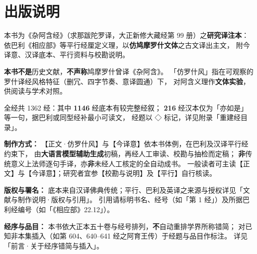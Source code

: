
\chapter*{出版说明}

本书为《杂阿含经》（求那跋陀罗译，大正新修大藏经第 99 册）之\textbf{研究译注本}：
依巴利《相应部》等平行经厘定义理，以\textbf{仿鸠摩罗什文体}之古文译出主文，
附今译意、汉译底本、平行资料与校勘说明。

\vspace{0.8em}
\noindent\textbf{本书不是}历史文献，\textbf{不声称}鸠摩罗什曾译《杂阿含》。
「仿罗什风」指在可观察的罗什译经风格特征（删冗、四字节奏、意译圆通）下，
对阿含义理作\textbf{文体实验}，供阅读与学术对照。

\vspace{0.8em}
\noindent 全经共 1362 经：其中 \textbf{1146} 经底本有较完整经叙；
\textbf{216} 经汉本仅为「亦如是」等一句，据巴利或同型经补最小可读文，
经题以 ◇ 标记，详见附录「重建经目录」。

\vspace{0.8em}
\noindent\textbf{制作方式：}
【正文·仿罗什风】与【今译意】依本书体例，在巴利及汉译平行经约束下，
由\textbf{大语言模型辅助生成}初稿，再经人工审读、校勘与抽检而定稿；
\textbf{非}传统意义上法师逐句手译，亦\textbf{非}未经人工核定的全自动成书。
一般读者可主读【正文】与【今译意】；研究者宜参【校勘与说明】及【平行】自行核读。

\vspace{0.8em}
\noindent\textbf{版权与署名：}
底本来自汉译佛典传统；平行、巴利及英译之来源与授权详见「文献与制作说明·版权与引用」。
引用请标明书名、经号（如「第 1 经」）及所据巴利经编号（如「《相应部》22.12」）。

\vspace{0.8em}
\noindent\textbf{经序与品目：}
本书依大正本五十卷与经号排列，\textbf{不}自动重排学界所称错简；
对已知非本集插入（如第 604、640--641 经之阿育王传）于经题与品目作标注。
详见「前言·关于经序错简与插入」。

\clearpage
